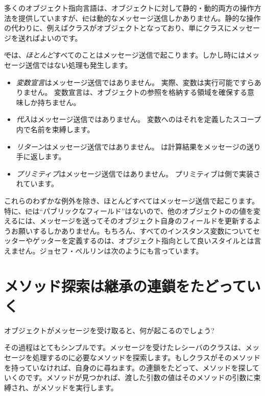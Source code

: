 \documentclass[a4paper,10pt,twoside]{book}
\begin{document}
多くのオブジェクト指向言語は、オブジェクトに対して静的・動的両方の操作方法を提供していますが、\st には動的なメッセージ送信しかありません。静的な操作の代わりに、例えばクラスがオブジェクトとなっており、単にクラスにメッセージを送ればよいのです。

\st では、\emph{ほとんど}すべてのことはメッセージ送信で起こります。しかし時にはメッセージ送信ではない処理も発生します。

\begin{itemize}
  \item \emph{変数宣言}はメッセージ送信ではありません。
		実際、変数は実行可能ですらありません。
		変数宣言は、オブジェクトの参照を格納する領域を確保する意味しか持ちません。
  \item \emph{代入}はメッセージ送信ではありません。
		変数へのはそれを定義したスコープ内で名前を束縛します。
  \item \emph{リターン}はメッセージ送信ではありません。
		は計算結果をメッセージの送り手に返します。
  \item \emph{プリミティブ}はメッセージ送信ではありません。
		プリミティブは側で実装されています。
\end{itemize}

これらのわずかな例外を除き、ほとんどすべてはメッセージ送信で起こります。特に、\st には``パブリックなフィールド''はないので、他のオブジェクトのの値を変えるには、メッセージを送ってそのオブジェクト自身のフィールドを更新するようお願いするしかありません。もちろん、すべてのインスタンス変数についてセッターやゲッターを定義するのは、オブジェクト指向として良いスタイルとは言えません。ジョセフ・ペルリンは次のようにも言っています。



\section{メソッド探索は継承の連鎖をたどっていく}


オブジェクトがメッセージを受け取ると、何が起こるのでしょう?

その過程はとてもシンプルです。メッセージを受けたレシーバのクラスは、メッセージを処理するのに必要なメソッドを探索します。もしクラスがそのメソッドを持っていなければ、自身のに尋ねます。の連鎖をたどって、メソッドを探していくのです。メソッドが見つかれば、渡した引数の値はそのメソッドの引数に束縛され、がメソッドを実行します。
\end{document}
